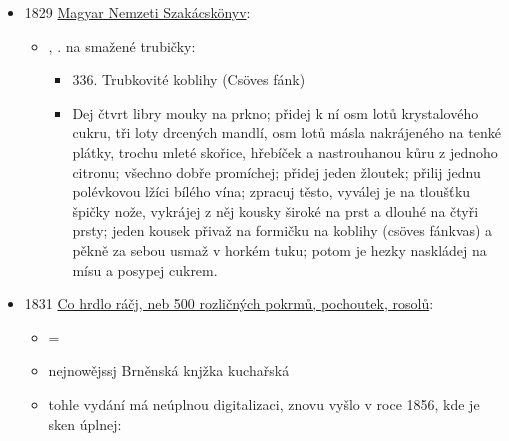 \begin{itemize}
  \begin{itemize}
  \tightlist
  \item
     ,  na  koláč na
    rožni, asi to bude překlad z Němčiny, pokud tomu dobře rozumín,
    původní autorka je  a knížka
    \emph{Allgemeines Österreichisches Oder Neuestes Wiener Kochbuch}
  \end{itemize}
\item
  1829
  \href{https://web.archive.org/web/20201229075645/http://www.kurtos.eu/dl/czifray.pdf}{Magyar
  Nemzeti Szakácskönyv}:

  \begin{itemize}
  \tightlist
  \item
     ,  .
     na smažené trubičky:

    \begin{itemize}
    \tightlist
    \item
      336. Trubkovité koblihy (Csöves fánk)
    \item
      Dej čtvrt libry mouky na prkno; přidej k ní osm lotů krystalového
      cukru, tři loty drcených mandlí, osm lotů másla nakrájeného na
      tenké plátky, trochu mleté skořice, hřebíček a nastrouhanou kůru z
      jednoho citronu; všechno dobře promíchej; přidej jeden žloutek;
      přilij jednu polévkovou lžíci bílého vína; zpracuj těsto, vyválej
      je na tloušťku špičky nože, vykrájej z něj kousky široké na prst a
      dlouhé na čtyři prsty; jeden kousek přivaž na formičku na koblihy
      (csöves fánkvas) a pěkně za sebou usmaž v horkém tuku; potom je
      hezky naskládej na mísu a posypej cukrem.
    \end{itemize}
  \end{itemize}
\item
  1831
  \href{https://ceskadigitalniknihovna.cz/uuid/uuid:0fa855e0-58a3-11e2-a66b-005056827e52}{Co
  hrdlo ráčj, neb 500 rozličných pokrmů, pochoutek, rosolů}:

  \begin{itemize}
  \tightlist
  \item
     = 
  \item
    nejnowějssj Brněnská knjžka kuchařská
  \item
    tohle vydání má neúplnou digitalizaci, znovu vyšlo v roce 1856, kde
    je sken úplnej:


\end{itemize}
\end{itemize}
